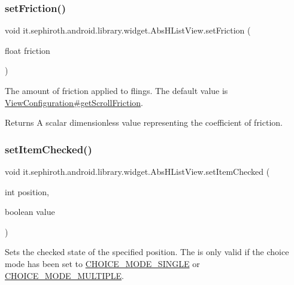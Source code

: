 \subsubsection{\texorpdfstring{set\+Friction()}{setFriction()}}
{\footnotesize\ttfamily void it.\+sephiroth.\+android.\+library.\+widget.\+Abs\+H\+List\+View.\+set\+Friction (\begin{DoxyParamCaption}\item[{float}]{friction }\end{DoxyParamCaption})}

The amount of friction applied to flings. The default value is \hyperlink{}{View\+Configuration\#get\+Scroll\+Friction}.

\begin{DoxyReturn}{Returns}
A scalar dimensionless value representing the coefficient of friction. 
\end{DoxyReturn}
\mbox{\label{classit_1_1sephiroth_1_1android_1_1library_1_1widget_1_1_abs_h_list_view_a99a00491ee5921f7ca14c58f50cbf4f3}} 
\subsubsection{\texorpdfstring{set\+Item\+Checked()}{setItemChecked()}}
{\footnotesize\ttfamily void it.\+sephiroth.\+android.\+library.\+widget.\+Abs\+H\+List\+View.\+set\+Item\+Checked (\begin{DoxyParamCaption}\item[{int}]{position,  }\item[{boolean}]{value }\end{DoxyParamCaption})}

Sets the checked state of the specified position. The is only valid if the choice mode has been set to \hyperlink{}{C\+H\+O\+I\+C\+E\+\_\+\+M\+O\+D\+E\+\_\+\+S\+I\+N\+G\+LE} or \hyperlink{}{C\+H\+O\+I\+C\+E\+\_\+\+M\+O\+D\+E\+\_\+\+M\+U\+L\+T\+I\+P\+LE}.


